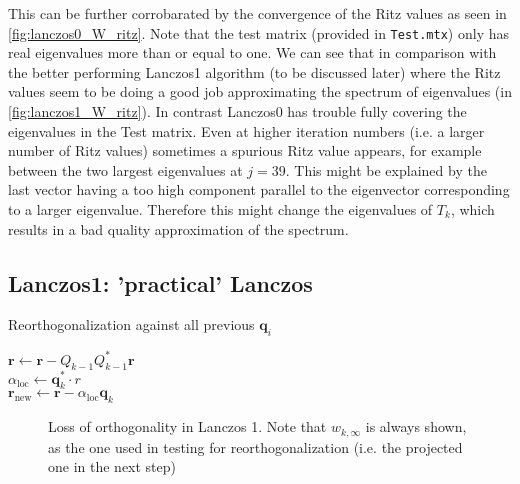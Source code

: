 \documentclass{article}
\begin{document}
	This can be further corrobarated by the convergence of the Ritz values as seen in \autoref{fig:lanczos0_W_ritz}. Note that the test matrix (provided in \texttt{Test.mtx}) only has real eigenvalues more than or equal to one. We can see that in 
	comparison with the better performing Lanczos1 algorithm (to be discussed later) where the Ritz values seem to be doing a good job approximating the spectrum of eigenvalues (in \autoref{fig:lanczos1_W_ritz}). In contrast Lanczos0 has trouble fully covering the eigenvalues in the Test matrix. Even at higher iteration numbers (i.e. a larger number of Ritz values) sometimes a spurious Ritz value appears, for example between the two largest eigenvalues at $j=39$. This might be explained by the last vector having a too high component parallel to the eigenvector corresponding to a larger eigenvalue. Therefore this might change the eigenvalues of $T_k$, which results in a bad quality approximation of the spectrum.
	
	
	
	\subsection{Lanczos1: 'practical' Lanczos}
	
	\begin{algorithm2e}[ht]
		\caption{Reorthogonalization against all previous $\textbf{q}_i$}\label{alg:reorthogonalization}
		
		$\textbf{r} \gets \textbf{r} - Q_{k-1} Q_{k-1}^\ast \textbf{r}$\\
		$\alpha_{\text{loc}} \gets \textbf{q}_k^\ast \cdot r$\\
		$\textbf{r}_{\text{new}} \gets \textbf{r} - \alpha_{\text{loc}}  \textbf{q}_k$\\
	\end{algorithm2e}
	
	\begin{figure}
		\centering
		\resizebox{\textwidth}{!}{
			}
		\caption{Loss of orthogonality in Lanczos 1. Note that $w_{k,\infty}$ is always shown, as the one used in testing for reorthogonalization (i.e. the projected one in the next step)}\label{fig:lanczos1_W}
	\end{figure}
	
\end{document}
